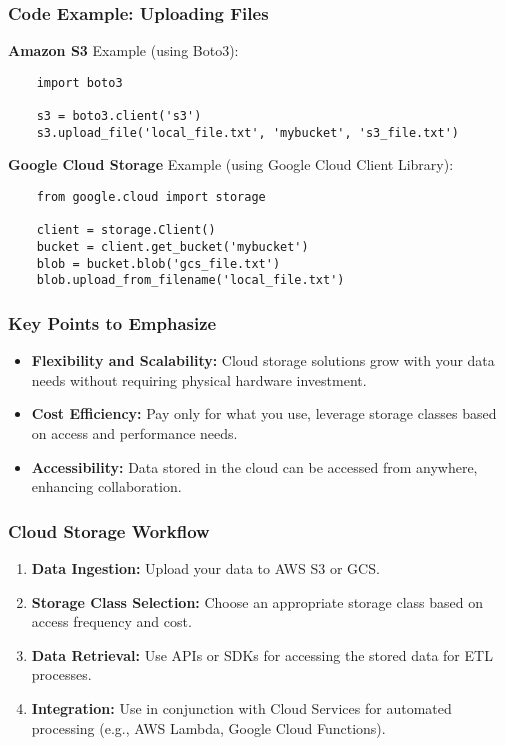 \documentclass[aspectratio=169]{beamer}
\begin{document}
\begin{frame}[fragile]
    \frametitle{Code Example: Uploading Files}
    
    \textbf{Amazon S3} Example (using Boto3):
    \begin{lstlisting}
    import boto3
    
    s3 = boto3.client('s3')
    s3.upload_file('local_file.txt', 'mybucket', 's3_file.txt')
    \end{lstlisting}
    
    \textbf{Google Cloud Storage} Example (using Google Cloud Client Library):
    \begin{lstlisting}
    from google.cloud import storage
    
    client = storage.Client()
    bucket = client.get_bucket('mybucket')
    blob = bucket.blob('gcs_file.txt')
    blob.upload_from_filename('local_file.txt')
    \end{lstlisting}
\end{frame}

\begin{frame}
    \frametitle{Key Points to Emphasize}
    \begin{itemize}
        \item \textbf{Flexibility and Scalability:} Cloud storage solutions grow with your data needs without requiring physical hardware investment.
        \item \textbf{Cost Efficiency:} Pay only for what you use, leverage storage classes based on access and performance needs.
        \item \textbf{Accessibility:} Data stored in the cloud can be accessed from anywhere, enhancing collaboration.
    \end{itemize}
\end{frame}

\begin{frame}
    \frametitle{Cloud Storage Workflow}
    \begin{enumerate}
        \item \textbf{Data Ingestion:} Upload your data to AWS S3 or GCS.
        \item \textbf{Storage Class Selection:} Choose an appropriate storage class based on access frequency and cost.
        \item \textbf{Data Retrieval:} Use APIs or SDKs for accessing the stored data for ETL processes.
        \item \textbf{Integration:} Use in conjunction with Cloud Services for automated processing (e.g., AWS Lambda, Google Cloud Functions).
    \end{enumerate}
\end{frame}
\end{document}
